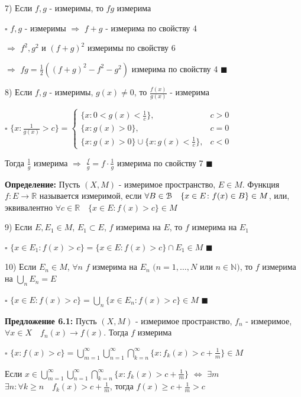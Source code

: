 \documentclass[a4paper]{report}
\begin{document}
7) Если $f,g$ - измеримы, то $fg$ измерима

\noindent $\square$ $f,g$ - измеримы $\Rightarrow$ $f+g$ - измерима по свойству 4 

$\Rightarrow$ $f^2,g^2$ и $(f+g)^2$ измеримы по свойству 6

$\Rightarrow$ $fg=\frac12\left((f+g)^2-f^2-g^2\right)$ измерима по свойству 4 $\blacksquare$
\bigskip
\bigskip

8) Если $f,g$ - измеримы, $g(x)\ne0$, то $\frac{f(x)}{g(x)}$ - измерима

\noindent $\square$ $\{x\colon\frac1{g(x)}>c\}=\begin{cases}\{x\colon0<g(x)<\frac1c\},&c>0\\ \{x\colon g(x)>0\},&c=0\\ \{x\colon g(x)>0\}\cup
\{x\colon g(x)<\frac1c\},&c<0\end{cases}$

Тогда $\frac1g$ измерима $\Rightarrow$ $\frac{f}{g}=f\cdot\frac1g$ измерима по свойству 7 $\blacksquare$
\bigskip

\noindent\textbf{Определение:} Пусть $(X,M)$ - измеримое пространство, $E\in M$. Функция $f\colon E\to\mathbb R$ называется измеримой, если $\forall B\in\EuScript B\quad\{x\in E\colon f(x)\in B\}\in M$, или, эквивалентно $\forall c\in\mathbb R\quad\{x\in E\colon f(x)>c\}\in M$
\bigskip

9) Если $E,E_1\in M$, $E_1\subset E$, $f$ измерима на $E$, то $f$ измерима на $E_1$

\noindent $\square$ $\{x\in E_1\colon f(x)>c\}=\{x\in E\colon f(x)>c\}\cap E_1\in M$ $\blacksquare$
\bigskip

10) Если $E_n\in M$, $\forall n$ $f$ измерима на $E_n$ $(n=1,\ldots,N$ или $n\in\mathbb N)$, то $f$ измерима на $\bigcup\limits_n E_n=E$

\noindent $\square$ $\{x\in E\colon f(x)>c\}=\bigcup\limits_n\{x\in E_n\colon f(x)>c\}\in M$ $\blacksquare$
\bigskip

\noindent\textbf{Предложение 6.1:} Пусть $(X,M)$ - измеримое пространство, $f_n$ - измеримое, $\forall x\in X\quad f_n(x)\to f(x)$. Тогда $f$ измерима

\noindent $\square$ $\{x\colon f(x)>c\}=\bigcup\limits_{m=1}^\infty\bigcup\limits_{n=1}^\infty\bigcap\limits_{k=n}^\infty\{x\colon f_k(x)> c+\frac1m\}\in M$

Если $x\in\bigcup\limits_{m=1}^\infty\bigcup\limits_{n=1}^\infty\bigcap\limits_{k=n}^\infty\{x\colon f_k(x)> c+\frac1m\}$ $\Leftrightarrow$ $\exists m$ $\exists n\colon\forall k\ge n\quad f_k(x)>c+\frac1m$, тогда $f(x)\ge c+\frac1m>c$
\end{document}
